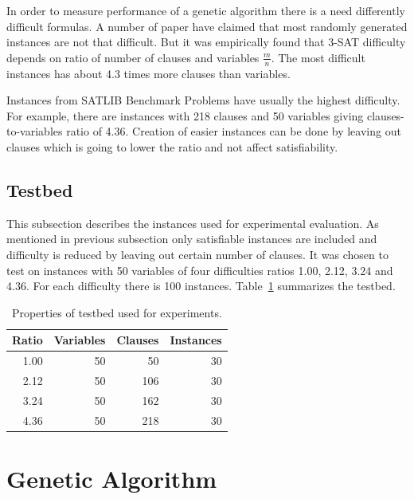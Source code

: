\documentclass{article}
\begin{document}
In order to measure performance of a genetic algorithm
there is a need differently difficult formulas.
A number of paper have claimed that most randomly generated instances are
not that difficult.
But it was empirically found that 3-SAT difficulty depends on ratio of
number of clauses and variables $\frac{m}{n}$.
The most difficult instances has about 4.3 times more clauses than variables.
\cite{selman1996}

Instances from SATLIB Benchmark Problems have usually the highest difficulty.
For example, there are instances with 218 clauses and 50 variables
giving clauses-to-variables ratio of 4.36.
Creation of easier instances can be done by leaving out clauses
which is going to lower the ratio and not affect satisfiability.

\subsection{Testbed}
\label{testbed}

This subsection describes the instances used for experimental evaluation.
As mentioned in previous subsection only satisfiable instances are included
and difficulty is reduced by leaving out certain number of clauses.
It was chosen to test on instances with 50 variables of four difficulties ratios
1.00, 2.12, 3.24 and 4.36.
For each difficulty there is 100 instances.
Table~\ref{testbed-table} summarizes the testbed.

\begin{table}[ht]
\caption{Properties of testbed used for experiments.}
\label{testbed-table}
\vskip 0.15in
\begin{center}
\begin{small}
\begin{sc}
\begin{tabular}{rrrr}
\toprule
Ratio & Variables & Clauses & Instances \\
\midrule
1.00 & 50 & 50  & 30 \\
2.12 & 50 & 106 & 30 \\
3.24 & 50 & 162 & 30 \\
4.36 & 50 & 218 & 30 \\
\bottomrule
\end{tabular}
\end{sc}
\end{small}
\end{center}
\vskip -0.1in
\end{table}

\section{Genetic Algorithm}
\end{document}
